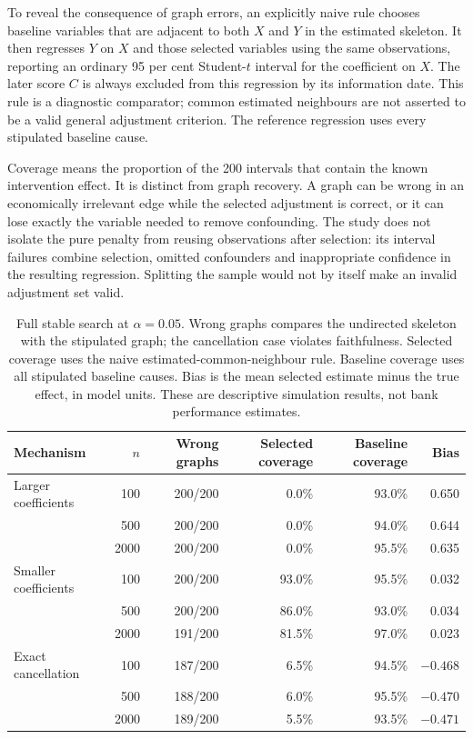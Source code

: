 To reveal the consequence of graph errors, an explicitly naive rule chooses
baseline variables that are adjacent to both $X$ and $Y$ in the estimated
skeleton. It then regresses $Y$ on $X$ and those selected variables using the
same observations, reporting an ordinary 95 per cent Student-$t$ interval for
the coefficient on $X$. The later score $C$ is always excluded from this
regression by its information date. This rule is a diagnostic comparator;
common estimated neighbours are not asserted to be a valid general adjustment
criterion. The reference regression uses every stipulated baseline cause.

Coverage means the proportion of the 200 intervals that contain the known
intervention effect. It is distinct from graph recovery. A graph can be wrong
in an economically irrelevant edge while the selected adjustment is correct,
or it can lose exactly the variable needed to remove confounding. The study
does not isolate the pure penalty from reusing observations after selection:
its interval failures combine selection, omitted confounders and inappropriate
confidence in the resulting regression. Splitting the sample would not by
itself make an invalid adjustment set valid.

\begin{table}[htbp]
\centering\small
\begin{tabular}{lrrrrr}
\toprule
Mechanism & $n$ & Wrong graphs & Selected coverage & Baseline coverage & Bias\\
\midrule
Larger coefficients &100&200/200&0.0\%&93.0\%&0.650\\
 &500&200/200&0.0\%&94.0\%&0.644\\
 &2000&200/200&0.0\%&95.5\%&0.635\\
Smaller coefficients &100&200/200&93.0\%&95.5\%&0.032\\
 &500&200/200&86.0\%&93.0\%&0.034\\
 &2000&191/200&81.5\%&97.0\%&0.023\\
Exact cancellation &100&187/200&6.5\%&94.5\%&$-0.468$\\
 &500&188/200&6.0\%&95.5\%&$-0.470$\\
 &2000&189/200&5.5\%&93.5\%&$-0.471$\\
\bottomrule
\end{tabular}
\caption{Full stable search at $\alpha=0.05$. Wrong graphs compares the
undirected skeleton with the stipulated graph; the cancellation case violates
faithfulness. Selected coverage uses the naive estimated-common-neighbour
rule. Baseline coverage uses all stipulated baseline causes. Bias is the
mean selected estimate minus the true effect, in model units. These are
descriptive simulation results, not bank performance estimates.}
\label{closure30:sampling-results}
\end{table}

